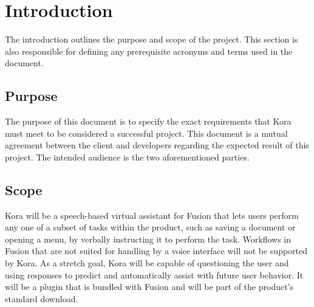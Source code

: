\documentclass[onecolumn, draftclsnofoot,10pt, compsoc]{IEEEtran}
\def \botname{Kora\xspace}
\begin{document}
\begin{titlepage}
\begin{singlespace}
{{            }
            \vspace{20pt}
        }
        \begin{abstract}
       		This document outlines the technical requirements that \botname must meet before the 2018 OSU Engineering Expo. 
            It starts with an overall description of the project and follows with specific functional and performance requirements.
            At the end, there is a Gantt chart which gives a timeline detailing when each major requirement will be completed.
        \end{abstract}     
    \end{singlespace}
\end{titlepage}
\newpage
{}
\tableofcontents
\clearpage

\section{Introduction}
        The introduction outlines the purpose and scope of the project. 
        This section is also responsible for defining any prerequisite acronyms and terms used in the document. 
    \subsection{Purpose}
        The purpose of this document is to specify the exact requirements that \botname must meet to be considered a successful project. 
        This document is a mutual agreement between the client and developers regarding the expected result of this project.
        The intended audience is the two aforementioned parties.
    \subsection{Scope}
        \botname will be a speech-based virtual assistant for Fusion that lets users perform any one of a subset of tasks within the product, such as saving a document or opening a menu, by verbally instructing it to perform the task.
        Workflows in Fusion that are not suited for handling by a voice interface will not be supported by \botname.
        As a stretch goal, \botname will be capable of questioning the user and using responses to predict and automatically assist with future user behavior.
        It will be a plugin that is bundled with Fusion and will be part of the product's standard download. 
\end{document}
